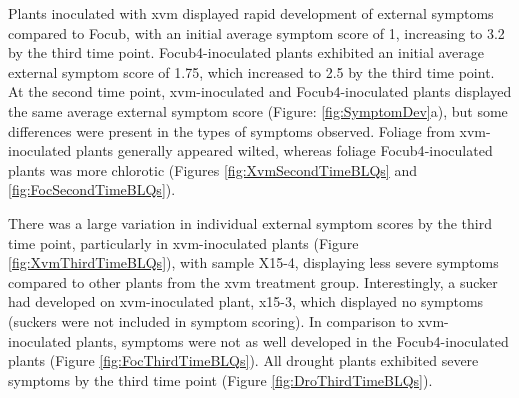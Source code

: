 Plants inoculated with \ac{xvm} displayed rapid development of external symptoms compared to \ac{Focub}, with an initial average symptom score of 1, increasing to 3.2 by the third time point. \ac{Focub4}-inoculated plants exhibited an initial average external symptom score of 1.75, which increased to 2.5 by the third time point. At the second time point, \ac{xvm}-inoculated and \ac{Focub4}-inoculated plants displayed the same average external symptom score (Figure: \ref{fig:SymptomDev}a), but some differences were present in the types of symptoms observed. Foliage from \ac{xvm}-inoculated plants generally appeared wilted, whereas foliage \ac{Focub4}-inoculated plants was more chlorotic (Figures \ref{fig:XvmSecondTimeBLQs} and \ref{fig:FocSecondTimeBLQs}).
 
There was a large variation in individual external symptom scores by the third time point, particularly in \ac{xvm}-inoculated plants (Figure \ref{fig:XvmThirdTimeBLQs}), with sample X15-4, displaying less severe symptoms compared to other plants from the \ac{xvm} treatment group. Interestingly, a sucker had developed on \ac{xvm}-inoculated plant, x15-3, which displayed no symptoms (suckers were not included in symptom scoring). In comparison to \ac{xvm}-inoculated plants, symptoms were not as well developed in the \ac{Focub4}-inoculated plants (Figure \ref{fig:FocThirdTimeBLQs}). All drought plants exhibited severe symptoms by the third time point (Figure \ref{fig:DroThirdTimeBLQs}).

